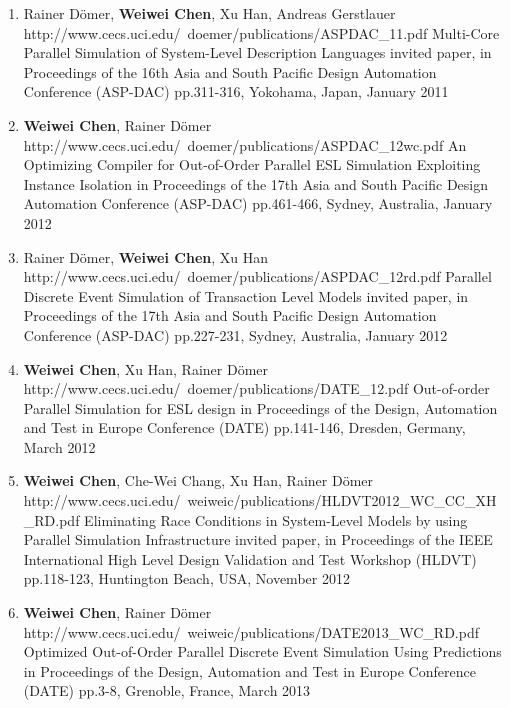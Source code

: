 \begin{enumerate}
	
\item
	\mypubhl
	{Rainer D\"{o}mer, \textbf{Weiwei Chen}, Xu Han, Andreas Gerstlauer}
	{http://www.cecs.uci.edu/~doemer/publications/ASPDAC_11.pdf}
	{Multi-Core Parallel Simulation of System-Level Description Languages}
	{invited paper, in Proceedings of }
	{the 16th Asia and South Pacific Design Automation Conference (ASP-DAC)}
	{pp.311-316, Yokohama, Japan, January 2011}
	
\item
	\mypubhl
	{\textbf{Weiwei Chen}, Rainer D\"{o}mer}
	{http://www.cecs.uci.edu/~doemer/publications/ASPDAC_12wc.pdf}
	{An Optimizing Compiler for Out-of-Order Parallel ESL Simulation Exploiting Instance Isolation}
	{in Proceedings of }
	{the 17th Asia and South Pacific Design Automation Conference (ASP-DAC)}
	{pp.461-466, Sydney, Australia, January 2012}
	
	
\item
	\mypubhl
	{Rainer D\"{o}mer, \textbf{Weiwei Chen}, Xu Han}
	{http://www.cecs.uci.edu/~doemer/publications/ASPDAC_12rd.pdf}
	{Parallel Discrete Event Simulation of Transaction Level Models}
	{invited paper, in Proceedings of }
	{the 17th Asia and South Pacific Design Automation Conference (ASP-DAC)}
	{pp.227-231, Sydney, Australia, January 2012}
	
	
\item
	\mypubhl
	{\textbf{Weiwei Chen}, Xu Han, Rainer D\"{o}mer}
	{http://www.cecs.uci.edu/~doemer/publications/DATE_12.pdf}
	{Out-of-order Parallel Simulation for ESL design}
	{in Proceedings of }
	{the Design, Automation and Test in Europe Conference (DATE)}
	{pp.141-146, Dresden, Germany, March 2012}
	
\item
	\mypubhl
	{\textbf{Weiwei Chen}, Che-Wei Chang, Xu Han, Rainer D\"{o}mer}
	{http://www.cecs.uci.edu/~weiweic/publications/HLDVT2012_WC_CC_XH_RD.pdf}
	{Eliminating Race Conditions in System-Level Models by using Parallel Simulation Infrastructure} 
	{invited paper, in Proceedings of }
	{the IEEE International High Level Design Validation and Test Workshop (HLDVT)}
	{pp.118-123, Huntington Beach, USA, November 2012}
	
	
\item
	\mypubhl
	{\textbf{Weiwei Chen}, Rainer D\"{o}mer} 
	{http://www.cecs.uci.edu/~weiweic/publications/DATE2013_WC_RD.pdf}
	{Optimized Out-of-Order Parallel Discrete Event Simulation Using Predictions}
	{in Proceedings of }
	{the Design, Automation and Test in Europe Conference  (DATE)}
	{pp.3-8, Grenoble, France, March 2013}
	

\end{enumerate}
